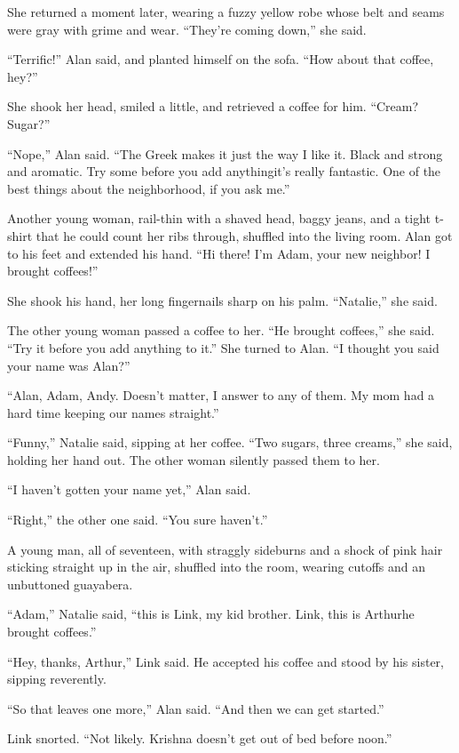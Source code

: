 She returned a moment later, wearing a fuzzy yellow robe whose belt
and seams were gray with grime and wear.  ``They're coming down,'' she
said.

``Terrific!'' Alan said, and planted himself on the sofa.  ``How about
that coffee, hey?''

She shook her head, smiled a little, and retrieved a coffee for him. 
``Cream?  Sugar?''

``Nope,'' Alan said.  ``The Greek makes it just the way I like it. 
Black and strong and aromatic.  Try some before you add
anything\dash{}it's really fantastic.  One of the best things about the
neighborhood, if you ask me.''

Another young woman, rail-thin with a shaved head, baggy jeans, and a
tight t-shirt that he could count her ribs through, shuffled into the
living room.  Alan got to his feet and extended his hand.  ``Hi there! 
I'm Adam, your new neighbor!  I brought coffees!''

She shook his hand, her long fingernails sharp on his palm. 
``Natalie,'' she said.

The other young woman passed a coffee to her.  ``He brought coffees,''
she said.  ``Try it before you add anything to it.'' She turned to
Alan.  ``I thought you said your name was Alan?''

``Alan, Adam, Andy.  Doesn't matter, I answer to any of them.  My mom
had a hard time keeping our names straight.''

``Funny,'' Natalie said, sipping at her coffee.  ``Two sugars, three
creams,'' she said, holding her hand out.  The other woman silently
passed them to her.

``I haven't gotten your name yet,'' Alan said.

``Right,'' the other one said.  ``You sure haven't.''

A young man, all of seventeen, with straggly sideburns and a shock of
pink hair sticking straight up in the air, shuffled into the room,
wearing cutoffs and an unbuttoned guayabera.

``Adam,'' Natalie said, ``this is Link, my kid brother.  Link, this is
Arthur\dash{}he brought coffees.''

``Hey, thanks, Arthur,'' Link said.  He accepted his coffee and stood
by his sister, sipping reverently.

``So that leaves one more,'' Alan said.  ``And then we can get
started.''

Link snorted.  ``Not likely.  Krishna doesn't get out of bed before
noon.''

